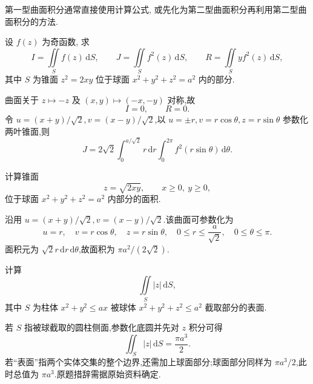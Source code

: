 \begin{remark}
    第一型曲面积分通常直接使用计算公式, 或先化为第二型曲面积分再利用第二型曲面积分的方法.
\end{remark}

\begin{example}
    设 $f(z)$ 为奇函数, 求
    \[
        I=\iint\limits_Sf(z)\,\mathrm{d}S,\qquad
        J=\iint\limits_Sf^2(z)\,\mathrm{d}S,\qquad
        R=\iint\limits_Syf^2(z)\,\mathrm{d}S,
    \]
    其中 $S$ 为锥面 $z^2=2xy$ 位于球面 $x^2+y^2+z^2=a^2$ 内的部分.
\end{example}
\exampleblank

\begin{solution}
    曲面关于 $z\mapsto-z$ 及 $(x,y)\mapsto(-x,-y)$ 对称,故
    \[
        I=0,\qquad R=0.
    \]
    令 $u=(x+y)/\sqrt{2},v=(x-y)/\sqrt{2}$,以
    $u=\pm r,v=r\cos\theta,z=r\sin\theta$ 参数化两叶锥面,则
    \[
        J=2\sqrt{2}\int_0^{a/\sqrt{2}}\!r\,\mathrm{d}r
        \int_0^{2\pi}f^2(r\sin\theta)\,\mathrm{d}\theta.
    \]
\end{solution}

\begin{example}
    计算锥面
    \[
        z=\sqrt{2xy},\qquad x\geq0,\ y\geq0,
    \]
    位于球面 $x^2+y^2+z^2=a^2$ 内部分的面积.
\end{example}
\exampleblank

\begin{solution}
    沿用 $u=(x+y)/\sqrt{2},v=(x-y)/\sqrt{2}$.该曲面可参数化为
    \[
        u=r,\quad v=r\cos\theta,\quad z=r\sin\theta,\quad
        0\leq r\leq\dfrac{a}{\sqrt{2}},\quad0\leq\theta\leq\pi.
    \]
    面积元为 $\sqrt{2}r\,\mathrm{d}r\,\mathrm{d}\theta$,故面积为 $\pi a^2/(2\sqrt{2})$.
\end{solution}

\begin{example}
    计算
    \[
        \displaystyle\iint\limits_S|z|\,\mathrm{d}S,
    \]
    其中 $S$ 为柱体 $x^2+y^2\leq ax$ 被球体 $x^2+y^2+z^2\leq a^2$ 截取部分的表面.
\end{example}
\exampleblank

\begin{solution}
    若 $S$ 指被球截取的圆柱侧面,参数化底圆并先对 $z$ 积分可得
    \[
        \displaystyle\iint_S|z|\,\mathrm{d}S=\dfrac{\pi a^3}{2}.
    \]
    若``表面''指两个实体交集的整个边界,还需加上球面部分;球面部分同样为 $\pi a^3/2$,此时总值为 $\pi a^3$.原题措辞需据原始资料确定.
\end{solution}

